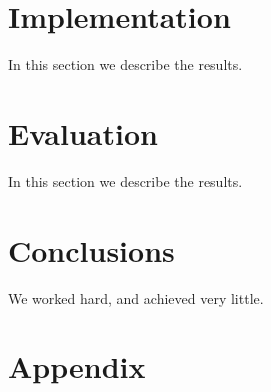 \documentclass[12pt,twocolumn,a4paper]{article}
\begin{document}
\section{Implementation}\label{implementation}
In this section we describe the results.





\section{Evaluation}\label{evaluation}
In this section we describe the results.

\section{Conclusions}\label{conclusions}
We worked hard, and achieved very little.

%
%





\section{Appendix}
\end{document}
